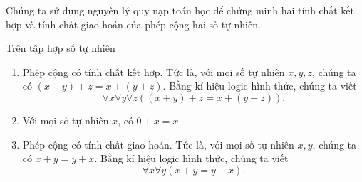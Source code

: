 Chúng ta sử dụng nguyên lý quy nạp toán học để chứng minh hai tính chất kết hợp và tính chất giao hoán của phép cộng hai số tự nhiên.
\begin{theorem}\label{theorem:property-of-natural-numbers-addition}
	Trên tập hợp số tự nhiên
	\begin{enumerate}[label={(\roman*)}]
		\item Phép cộng có tính chất kết hợp. Tức là, với mọi số tự nhiên $x, y, z$, chúng ta có $(x + y) + z = x + (y + z)$. Bằng kí hiệu logic hình thức, chúng ta viết
		      \[
			      \forall x\forall y\forall z \left( (x + y) + z = x + (y + z) \right).
		      \]
		\item Với mọi số tự nhiên $x$, có $0 + x = x$.
		\item Phép cộng có tính chất giao hoán.  Tức là, với mọi số tự nhiên $x, y$, chúng ta có $x + y = y + x$. Bằng kí hiệu logic hình thức, chúng ta viết
		      \[
			      \forall x\forall y \left( x + y = y + x \right).
		      \]
	\end{enumerate}
\end{theorem}

